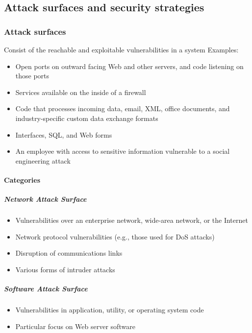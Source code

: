 \documentclass{article}
\begin{document}
        \subsection{Attack surfaces and security strategies}
             \subsubsection{Attack surfaces}
             Consist of the reachable and exploitable vulnerabilities in a system
             Examples:\\
             \begin{itemize}
                \item Open ports on outward facing Web and other servers, and code listening on those ports
                \item Services available on the inside of a firewall
                \item Code that processes incoming data, email, XML, office documents, and industry-specific custom data exchange formats
                \item Interfaces, SQL, and Web forms
                \item An employee with access to sensitive information vulnerable to a social engineering attack
            \end{itemize}
                \paragraph{Categories}
                    \subparagraph{Network Attack Surface}
                    \begin{itemize}
                        \item Vulnerabilities over an enterprise network, wide-area network, or the Internet
                        \item Network protocol vulnerabilities (e.g., those used for DoS attacks)
                        \item Disruption of communications links
                        \item Various forms of intruder attacks
                    \end{itemize}
                    
                    \subparagraph{Software Attack Surface}
                    \begin{itemize}
                        \item Vulnerabilities in application, utility, or operating system code
                        \item Particular focus on Web server software
                    \end{itemize}
                    
\end{document}
